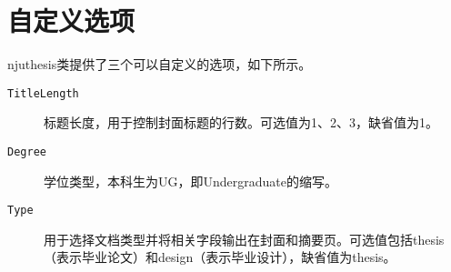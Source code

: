 \section{自定义选项}
\label{sec:classoptions}

njuthesis类提供了三个可以自定义的选项，如下所示。
\begin{description}
    \item[\texttt{TitleLength}] 标题长度，用于控制封面标题的行数。可选值为1、2、3，缺省值为1。
    \item[\texttt{Degree}] 学位类型，本科生为UG，即Undergraduate的缩写。
    \item[\texttt{Type}] 用于选择文档类型并将相关字段输出在封面和摘要页。可选值包括thesis（表示毕业论文）和design（表示毕业设计），缺省值为thesis。
\end{description}


